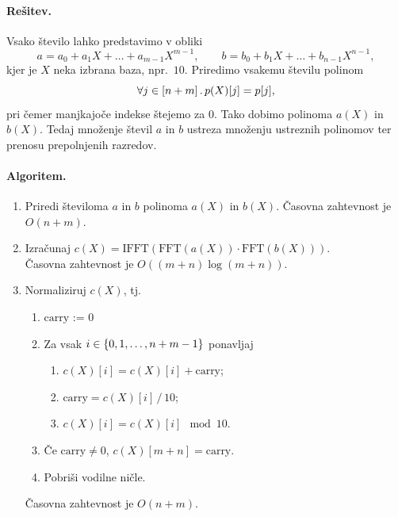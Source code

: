\documentclass[11pt, a4paper]{article}
\begin{document}
\paragraph{Rešitev.} Vsako število lahko predstavimo v obliki 
\[
    a = a_0 + a_1 X + \ldots + a_{m - 1} X^{m - 1}, \qquad b = b_0 + b_1 X + \ldots + b_{n - 1} X^{n - 1},
\]
kjer je \(X\) neka izbrana baza, npr.\ \(10\). Priredimo vsakemu številu polinom 
\[
    \forall j \in [n + m] \,.\, p(X)[j] = p[j],
\]
pri čemer manjkajoče indekse štejemo za 0. Tako dobimo polinoma \(a(X)\) in \(b(X)\). Tedaj množenje števil \(a\) in \(b\) ustreza množenju ustreznih polinomov ter prenosu prepolnjenih razredov.

\paragraph{Algoritem.}
\begin{enumerate}
    \item Priredi številoma \(a\) in \(b\) polinoma \(a(X)\) in \(b(X)\). Časovna zahtevnost je \(O(n + m)\).
    \item Izračunaj \(c(X) = \text{IFFT}(\text{FFT}(a(X)) \cdot \text{FFT}(b(X)))\).\\ Časovna zahtevnost je \(O((m+n) \log (m+n))\).
    \item Normaliziruj \(c(X)\), tj.
    \begin{enumerate}
        \item \(\text{carry := 0}\)
        \item Za vsak \(i \in \{0, 1, \ldots, n + m - 1\}\) ponavljaj
        \begin{enumerate}
            \item \(c(X)[i] = c(X)[i] + \text{carry}\);
            \item \(\text{carry} = c(X)[i]\, /\, 10\);
            \item \(c(X)[i] = c(X)[i] \mod 10\).
        \end{enumerate}
        \item Če \(\text{carry} \neq 0\), \(c(X)[m+n] = \text{carry}\).
        \item Pobriši vodilne ničle.
    \end{enumerate}
    Časovna zahtevnost je \(O(n + m)\).
\end{enumerate}
\end{document}
